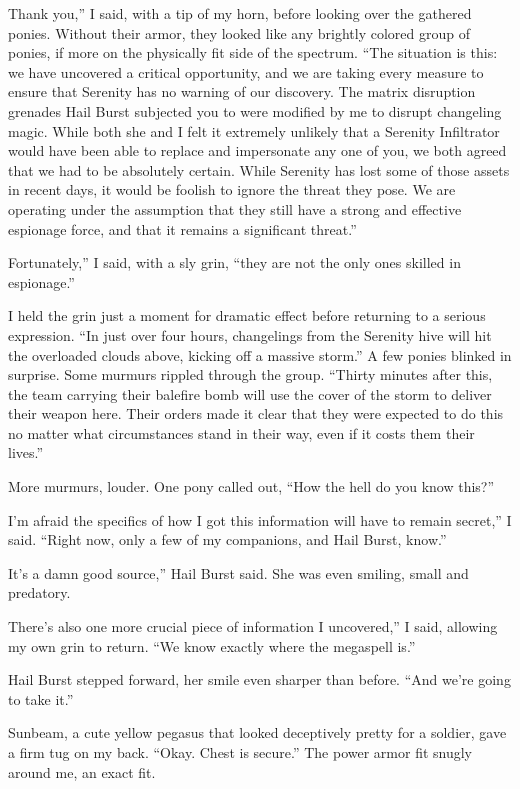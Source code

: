 \leavevmode{}Thank you,” I said, with a tip of my horn, before looking over the gathered ponies. Without their armor, they looked like any brightly colored group of ponies, if more on the physically fit side of the spectrum. “The situation is this: we have uncovered a critical opportunity, and we are taking every measure to ensure that Serenity has no warning of our discovery. The matrix disruption grenades Hail Burst subjected you to were modified by me to disrupt changeling magic. While both she and I felt it extremely unlikely that a Serenity Infiltrator would have been able to replace and impersonate any one of you, we both agreed that we had to be absolutely certain. While Serenity has lost some of those assets in recent days, it would be foolish to ignore the threat they pose. We are operating under the assumption that they still have a strong and effective espionage force, and that it remains a significant threat.”

\leavevmode{}Fortunately,” I said, with a sly grin, “they are not the only ones skilled in espionage.”

I held the grin just a moment for dramatic effect before returning to a serious expression. “In just over four hours, changelings from the Serenity hive will hit the overloaded clouds above, kicking off a massive storm.” A few ponies blinked in surprise. Some murmurs rippled through the group. “Thirty minutes after this, the team carrying their balefire bomb will use the cover of the storm to deliver their weapon here. Their orders made it clear that they were expected to do this no matter what circumstances stand in their way, even if it costs them their lives.”

More murmurs, louder. One pony called out, “How the hell do you know this?”

\leavevmode{}I’m afraid the specifics of how I got this information will have to remain secret,” I said. “Right now, only a few of my companions, and Hail Burst, know.”

\leavevmode{}It’s a damn good source,” Hail Burst said. She was even smiling, small and predatory.

\leavevmode{}There’s also one more crucial piece of information I uncovered,” I said, allowing my own grin to return. “We know exactly where the megaspell is.”

Hail Burst stepped forward, her smile even sharper than before. “And we’re going to take it.”

{\br}%
Sunbeam, a cute yellow pegasus that looked deceptively pretty for a soldier, gave a firm tug on my back. “Okay. Chest is secure.” The power armor fit snugly around me, an exact fit.

